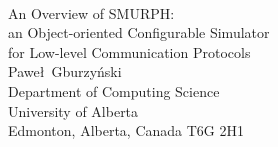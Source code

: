 \vspace*{3cm} \ \\
\begin{center}
{\Huge An Overview of SMURPH:}\vspace{0.7cm} \\
{\LARGE an Object-oriented Configurable Simulator \vspace{0.4cm}\\
for Low-level Communication Protocols} \vspace{3cm}\\

Pawe\l\ Gburzy\'{n}ski \vspace{0.5cm} \\

Department of Computing Science \\
University of Alberta \\
Edmonton, Alberta, Canada T6G 2H1
\end{center}
\newpage
